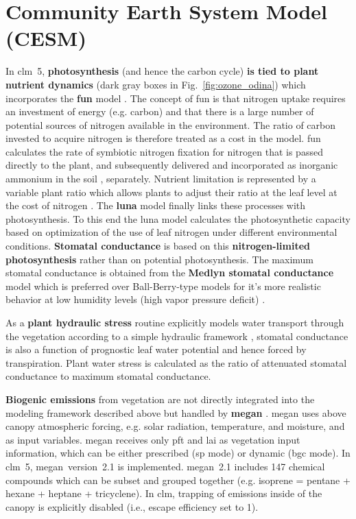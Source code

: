 \section{Community Earth System Model (CESM)}
\label{sec:cesm}
In \gls{clm}~5, \textbf{photosynthesis} (and hence the carbon cycle) \textbf{is tied to plant nutrient dynamics} (dark gray boxes in Fig.~\ref{fig:ozone_odina}) which incorporates the \textbf{\gls{fun}} model \parencites{GBC:Fisher2010}{JGR:Brzostek2014}{GCB:Shi2015}. The concept of \gls{fun} is that nitrogen uptake requires an investment of energy (e.g. carbon) and that there is a large number of potential sources of nitrogen available in the environment. The ratio of carbon invested to acquire nitrogen is therefore treated as a cost in the model. \gls{fun} calculates the rate of symbiotic nitrogen fixation for nitrogen that is passed directly to the plant, and subsequently delivered and incorporated as inorganic ammonium in the soil \parencite{GBC:Cleveland1999}, separately. Nutrient limitation is represented by a variable plant  ratio which allows plants to adjust their  ratio at the leaf level at the cost of nitrogen \parencite{JAMES:Ghimire2016}. The \textbf{\gls{luna}} model \parencites{STE:Xu2019}{GMD:Ali2016} finally links these processes with photosynthesis. To this end the \gls{luna} model calculates the photosynthetic capacity based on optimization of the use of leaf nitrogen under different environmental conditions. \textbf{Stomatal conductance} is based on this \textbf{nitrogen-limited photosynthesis} rather than on potential photosynthesis. The maximum stomatal conductance is obtained from the \textbf{Medlyn stomatal conductance} model \parencite{GCB:Medlyn2011} which is preferred over Ball-Berry-type models \parencite{BallBerry1987} for it’s more realistic behavior at low humidity levels (high vapor pressure deficit) \parencites{PR:Rogers2013}{NP:Rogers2017}.

As a \textbf{plant hydraulic stress} routine explicitly models water transport through the vegetation according to a simple hydraulic framework \parencite{JAMES:Kennedy2019}, stomatal conductance is also a function of prognostic leaf water potential and hence forced by transpiration. Plant water stress is calculated as the ratio of attenuated stomatal conductance to maximum stomatal conductance.

\textbf{Biogenic emissions} from vegetation are not directly integrated into the modeling framework described above but handled by \textbf{\gls{megan}} \parencite{ACP:Guenther2006}. \gls{megan} uses above canopy atmospheric forcing, e.g. solar radiation, temperature, and moisture, and \ch{[CO_2]} as input variables. \gls{megan} receives only \gls{pft} and \gls{lai} as vegetation input information, which can be either prescribed (\gls{sp} mode) or dynamic (\gls{bgc} mode). In \gls{clm}~5, \gls{megan}~version~2.1 \parencite{GMD:Guenther2012} is implemented. \gls{megan}~2.1 includes 147 chemical compounds which can be subset and grouped together (e.g. isoprene = pentane + hexane + heptane + tricyclene). In \gls{clm}, trapping of emissions inside of the canopy is explicitly disabled (i.e., escape efficiency set to 1).

